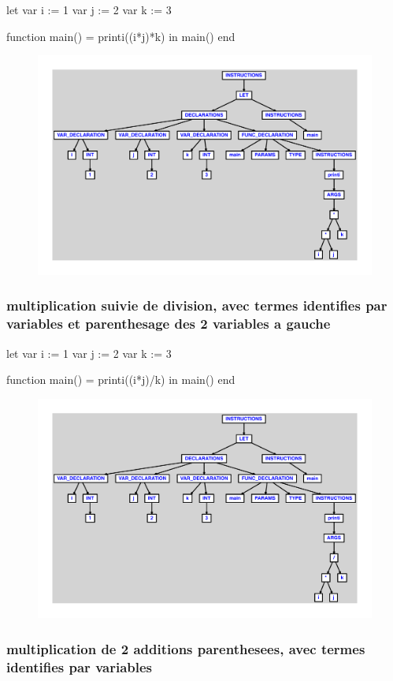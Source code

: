 \documentclass{article}
\begin{document}
\begin{verbatimtab}
let
	var i := 1
	var j := 2
	var k := 3

	function main() = printi((i*j)*k)
in main() end
\end{verbatimtab}
\begin{figure}[H]\centering\includegraphics[max width=\textwidth]{ast/ast_125.pdf}\end{figure}\subsubsection{multiplication suivie de division, avec termes identifies par variables et parenthesage des 2 variables a gauche}
\begin{verbatimtab}
let
	var i := 1
	var j := 2
	var k := 3

	function main() = printi((i*j)/k)
in main() end
\end{verbatimtab}
\begin{figure}[H]\centering\includegraphics[max width=\textwidth]{ast/ast_126.pdf}\end{figure}\subsubsection{multiplication de 2 additions parenthesees, avec termes identifies par variables}
\end{document}
